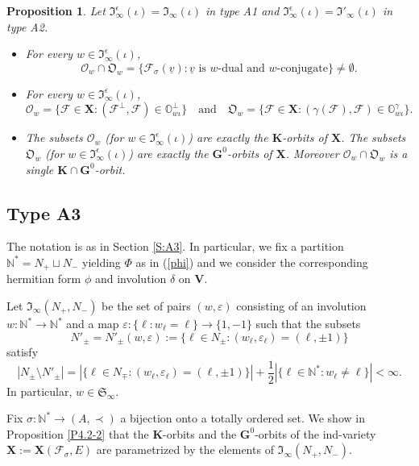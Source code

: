 \documentclass{amsart}
\newtheorem{proposition}{Proposition}
\theoremstyle{definition}
\newcommand{\NN}{\mathbb{N}^*}
\newcommand{\bs}[1]{\boldsymbol{#1}}
\begin{document}
\begin{proposition}
\label{P4-1.1}
Let $\mathfrak{I}^\epsilon_\infty(\iota)=\mathfrak{I}_\infty(\iota)$ in type A1
and $\mathfrak{I}^\epsilon_\infty(\iota)=\mathfrak{I}'_\infty(\iota)$ in type A2.
\begin{itemize}
\item[\rm (a)] For every $w\in\mathfrak{I}^\epsilon_\infty(\iota)$, \[\bs{\mathcal{O}}_w\cap\bs{\mathfrak{O}}_w=\{\mathcal{F}_\sigma(\underline{v}):\mbox{$\underline{v}$ is $w$-dual and $w$-conjugate}\}\not=\emptyset.\]
\item[\rm (b)] For every $w\in\mathfrak{I}^\epsilon_\infty(\iota)$,
\[
\bs{\mathcal{O}}_w=\{\mathcal{F}\in\mathbf{X}:(\mathcal{F}^\perp,\mathcal{F})\in\pmb{\mathbb{O}}^\perp_{w\iota}\} \quad\mbox{and}\quad
\bs{\mathfrak{O}}_w=\{\mathcal{F}\in\mathbf{X}:(\gamma(\mathcal{F}),\mathcal{F})\in\pmb{\mathbb{O}}^\gamma_{w\iota}\}.
\]
\item[\rm (c)] The subsets $\bs{\mathcal{O}}_w$ (for $w\in\mathfrak{I}^\epsilon_\infty(\iota)$) are exactly the $\mathbf{K}$-orbits of $\mathbf{X}$.
The subsets $\bs{\mathfrak{O}}_w$ (for $w\in\mathfrak{I}^\epsilon_\infty(\iota)$) are exactly the $\mathbf{G}^0$-orbits of $\mathbf{X}$.
Moreover $\bs{\mathcal{O}}_w\cap\bs{\mathfrak{O}}_w$ is a single $\mathbf{K}\cap\mathbf{G}^0$-orbit.
\end{itemize}
\end{proposition}

\subsection{Type A3}

\label{S4.2}

The notation is as in Section \ref{S:A3}.
In particular, we fix a partition $\NN=N_+\sqcup N_-$ yielding $\Phi$ as in (\ref{phi}) and we consider the corresponding
hermitian form $\phi$ and involution $\delta$ on $\mathbf{V}$.

Let $\mathfrak{I}_\infty(N_+,N_-)$ be the set of pairs $(w,\varepsilon)$ consisting of an involution $w:\NN\to\NN$ and a map $\varepsilon:\{\ell:w_\ell=\ell\}\to\{1,-1\}$ such that the subsets
\[N'_\pm=N'_\pm(w,\varepsilon):=\{\ell\in N_\pm:(w_\ell,\varepsilon_\ell)=(\ell,\pm1)\}
\]
satisfy
\[|N_\pm\setminus N'_\pm|=|\{\ell\in N_\mp:(w_\ell,\varepsilon_\ell)=(\ell,\pm 1)\}|+\frac{1}{2}|\{\ell\in\NN:w_\ell\not=\ell\}|<\infty.\]
In particular, $w\in\mathfrak{S}_\infty$.

Fix $\sigma:\NN\to (A,\prec)$ a bijection onto a totally ordered set.
We show in Proposition \ref{P4.2-2} that the $\mathbf{K}$-orbits and the $\mathbf{G}^0$-orbits of the ind-variety $\mathbf{X}:=\mathbf{X}(\mathcal{F}_\sigma,E)$ are parametrized by the elements of $\mathfrak{I}_\infty(N_+,N_-)$.
\end{document}
